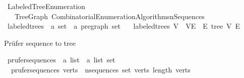 %
\begin{isabellebody}%
%
%
\isadelimdocument
%
\endisadelimdocument
%
\isatagdocument
%
\isamarkuptrue%
%
\endisatagdocument
{\isafolddocument}%
%
\isadelimdocument
%
\endisadelimdocument
%
\isadelimtheory
%
\endisadelimtheory
%
\isatagtheory
{}\isamarkupfalse%
\ Labeled{\isacharunderscore}{\kern0pt}Tree{\isacharunderscore}{\kern0pt}Enumeration\isanewline
\ \ \ Tree{\isacharunderscore}{\kern0pt}Graph\ Combinatorial{\isacharunderscore}{\kern0pt}Enumeration{\isacharunderscore}{\kern0pt}Algorithms{\isachardot}{\kern0pt}n{\isacharunderscore}{\kern0pt}Sequences\isanewline
{}%
\endisatagtheory
{\isafoldtheory}%
%
\isadelimtheory
%
\endisadelimtheory
%
\isadelimdocument
%
\endisadelimdocument
%
\isatagdocument
%
\isamarkuptrue%
%
\endisatagdocument
{\isafolddocument}%
%
\isadelimdocument
%
\endisadelimdocument
{}\isamarkupfalse%
\ labeled{\isacharunderscore}{\kern0pt}trees\ {\isacharcolon}{\kern0pt}{\isacharcolon}{\kern0pt}\ {\isachardoublequoteopen}{\isacharprime}{\kern0pt}a\ set\ {\isasymRightarrow}\ {\isacharprime}{\kern0pt}a\ pregraph\ set{\isachardoublequoteclose}\ \isanewline
\ \ {\isachardoublequoteopen}labeled{\isacharunderscore}{\kern0pt}trees\ V\ {\isacharequal}{\kern0pt}\ {\isacharbraceleft}{\kern0pt}{\isacharparenleft}{\kern0pt}V{\isacharcomma}{\kern0pt}E{\isacharparenright}{\kern0pt}\ {\isacharbar}{\kern0pt}\ E{\isachardot}{\kern0pt}\ tree\ V\ E{\isacharbraceright}{\kern0pt}{\isachardoublequoteclose}%
\isadelimdocument
%
\endisadelimdocument
%
\isatagdocument
%
\isamarkuptrue%
%
\endisatagdocument
{\isafolddocument}%
%
\isadelimdocument
%
\endisadelimdocument
%
\begin{isamarkuptext}%
Prüfer sequence to tree%
\end{isamarkuptext}\isamarkuptrue%
\isamarkupfalse%
\ prufer{\isacharunderscore}{\kern0pt}sequences\ {\isacharcolon}{\kern0pt}{\isacharcolon}{\kern0pt}\ {\isachardoublequoteopen}{\isacharprime}{\kern0pt}a\ list\ {\isasymRightarrow}\ {\isacharprime}{\kern0pt}a\ list\ set{\isachardoublequoteclose}\ \isanewline
\ \ {\isachardoublequoteopen}prufer{\isacharunderscore}{\kern0pt}sequences\ verts\ {\isacharequal}{\kern0pt}\ n{\isacharunderscore}{\kern0pt}sequences\ {\isacharparenleft}{\kern0pt}set\ verts{\isacharparenright}{\kern0pt}\ {\isacharparenleft}{\kern0pt}length\ verts\ {\isacharminus}{\kern0pt}\ {}{\isacharparenright}{\kern0pt}{\isachardoublequoteclose}\isanewline

\end{isabellebody}
